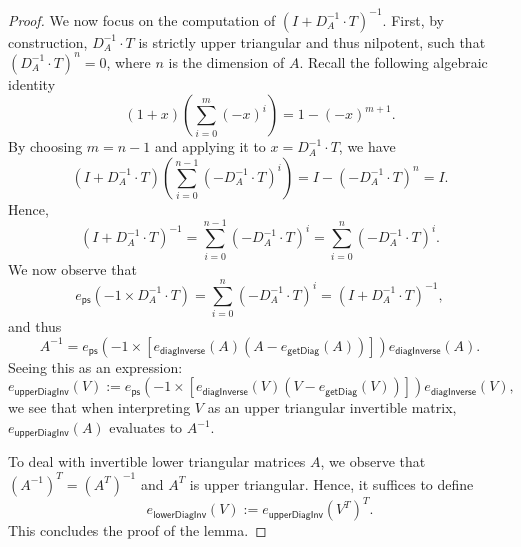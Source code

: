 \begin{proof}
    We now focus on the computation of $\left( I+D_A^{-1}\cdot T\right)^{-1}$. First, by construction, $D_A^{-1}\cdot T$ is strictly upper triangular and thus nilpotent, 
    such that $\left( D_A^{-1}\cdot T\right)^n=0$, where $n$ is the dimension of $A$.
    Recall the following algebraic identity 
    $$(1+x)\left( \sum_{i=0}^{m}(-x)^i \right)=1-(-x)^{m+1}.$$
    By choosing $m=n-1$ and applying it to $x=D_A^{-1}\cdot T$, we have
    $$
    \left(I+D_A^{-1}\cdot T \right)\left( \sum_{i=0}^{n-1}(-D_A^{-1}\cdot T)^i \right)=I- \left( -D_A^{-1}\cdot T\right)^n =I.
    $$
    Hence,
    $$
    \left(I+D_A^{-1}\cdot T \right)^{-1}=\sum_{i=0}^{n-1}(-D_A^{-1}\cdot T)^i=\sum_{i=0}^{n}(-D_A^{-1}\cdot T)^i.
    $$
    We now observe that
    $$
    e_{\mathsf{ps}}(-1\times D_A^{-1}\cdot T)=\sum_{i=0}^{n}(-D_A^{-1}\cdot T)^i=\left(I+D_A^{-1}\cdot T \right)^{-1},
    $$
    and thus 
    $$
    A^{-1}= e_{\mathsf{ps}}\left(-1\times \left[e_{\mathsf{diagInverse}}(A)(A-e_{\mathsf{getDiag}}(A))\right] \right)e_{\mathsf{diagInverse}}(A).
    $$
    Seeing this as an expression:
    $$
    e_{\mathsf{upperDiagInv}}(V):= e_{\mathsf{ps}}\left(-1\times \left[e_{\mathsf{diagInverse}}(V)(V-e_{\mathsf{getDiag}}(V))\right] \right)e_{\mathsf{diagInverse}}(V),
    $$
    we see that  when interpreting $V$ as an  upper triangular invertible matrix, 
    $e_{\mathsf{upperDiagInv}}(A)$ evaluates to $A^{-1}$.


    To deal with invertible lower triangular matrices $A$, we observe that  $\left(A^{-1}\right)^T=\left(A^T\right)^{-1}$ and $A^T$ is upper triangular.
    Hence, it suffices to define
    $$
    e_{\mathsf{lowerDiagInv}}(V):= e_{\mathsf{upperDiagInv}}(V^T)^T.
    $$
    This concludes the proof of the lemma.
\end{proof}

